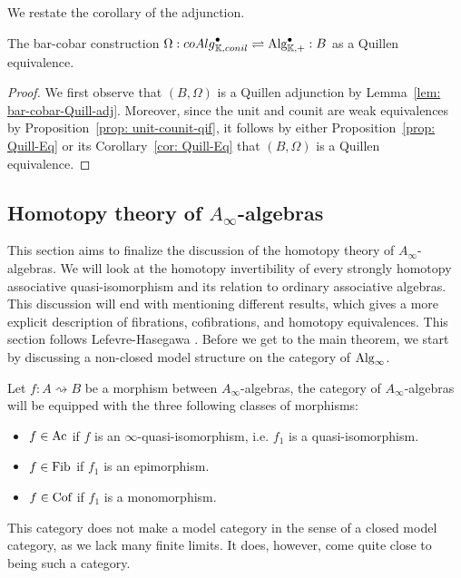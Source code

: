 \documentclass[../thesis.tex]{subfiles}
\begin{document}
        We restate the corollary of the adjunction.
        \begin{corollary}\label{cor: cobar-bar-quill-eq}
            The bar-cobar construction $\Omega : {coAlg}^\bullet_{\mathbb{K},conil} \rightleftharpoons \tt{Alg}^\bullet_{\mathbb{K},+} : B$ as a Quillen equivalence.
        \end{corollary}

        \begin{proof}
            We first observe that $(B, \Omega)$ is a Quillen adjunction by Lemma~\ref{lem: bar-cobar-Quill-adj}. Moreover, since the unit and counit are weak equivalences by Proposition~\ref{prop: unit-counit-qif}, it follows by either Proposition~\ref{prop: Quill-Eq} or its Corollary~\ref{cor: Quill-Eq} that $(B, \Omega)$ is a Quillen equivalence.
        \end{proof}

    \subsection{Homotopy theory of $A_{\infty}$-algebras}

        This section aims to finalize the discussion of the homotopy theory of $A_{\infty}$-algebras. We will look at the homotopy invertibility of every strongly homotopy associative quasi-isomorphism and its relation to ordinary associative algebras. This discussion will end with mentioning different results, which gives a more explicit description of fibrations, cofibrations, and homotopy equivalences. This section follows Lefevre-Hasegawa \cite{LefevreHasegawa03}. Before we get to the main theorem, we start by discussing a non-closed model structure on the category of $\tt{Alg}_\infty$.

        Let $f: A \rightsquigarrow B$ be a morphism between $A_\infty$-algebras, the category of $A_\infty$-algebras will be equipped with the three following classes of morphisms:
        \begin{itemize}
            \item $f\in \tt{Ac}$ if $f$ is an $\infty$-quasi-isomorphism, i.e. $f_1$ is a quasi-isomorphism.
            \item $f\in \tt{Fib}$ if $f_1$ is an epimorphism.
            \item $f\in \tt{Cof}$ if $f_1$ is a monomorphism.
        \end{itemize}

        This category does not make a model category in the sense of a closed model category, as we lack many finite limits. It does, however, come quite close to being such a category.
\end{document}
